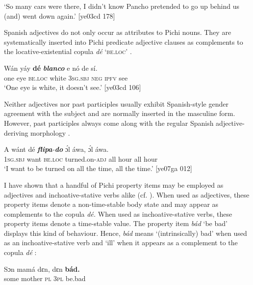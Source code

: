 \glt ‘So many cars were there, I didn’t know Pancho pretended to 
go up behind us (and) went down again.’ [ye03cd 178]
\z

Spanish adjectives do not only occur as attributes to Pichi nouns. They are systematically inserted into Pichi predicate adjective clauses as complements to the locative-existential copula \textit{dé} \textsc{‘be.loc’} . 


\ea%
    \label{ex:key:1716}
    \gll Wán    yáy  \textbf{dé}    \textbf{\textit{blanco}}  e    nó  de  sí.\\
one    eye  \textsc{be.loc}  white  \textsc{3sg.sbj}  \textsc{neg}  \textsc{ipfv}  see\\
\glt ‘One eye is white, it doesn’t see.’ [ye03cd 106]
\z

Neither adjectives nor past participles usually exhibit Spanish-style gender agreement with the subject and are normally inserted in the masculine form. However, past participles always come along with the regular Spanish adjective-deriving morphology .


\ea%
    \label{ex:key:1717}
    \gll \MakeUppercase{A}   wánt  dé    \textbf{\textit{flipa}}\textit{{}-}\textbf{\textit{do}}      ɔ́l  áwa,    ɔ́l  áwa.\\
\textsc{1sg.sbj}  want  \textsc{be.loc}  turned.on-\textsc{adj}    all  hour  all  hour\\

\glt ‘I want to be turned on all the time, all the time.’ [ye07ga 012]
\z

I have shown that a handful of Pichi property items may be employed as adjectives and inchoative-stative verbs alike (cf. ). When used as adjectives, these property items denote a non-time-stable body state and may appear as complements to the copula \textit{dé.} When used as inchoative-stative verbs, these property items denote a time-stable value. The property item \textit{bád} ‘be bad’ displays this kind of behaviour. Hence, \textit{bád} means ‘(intrinsically) bad’  when used as an inchoative-stative verb and ‘ill’ when it appears as a complement to the copula \textit{dé} : 


\ea%
    \label{ex:key:1718}
    \gll Sɔn    mamá  dɛn,    dɛn  \textbf{bád.}\\
some  mother  \textsc{pl}    \textsc{3pl}  be.bad\\


